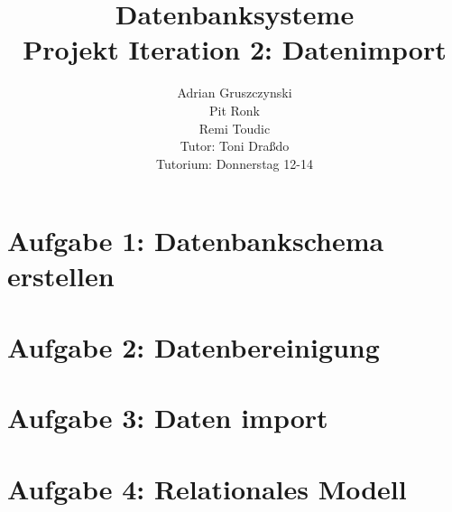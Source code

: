 \documentclass[12pt]{article}
\title{Datenbanksysteme\\
			 Projekt Iteration 2: Datenimport}
\author{Adrian Gruszczynski\\ 
			Pit Ronk\\ %
			Remi Toudic\\ %
		Tutor: Toni Draßdo\\
		Tutorium: Donnerstag 12-14}
\begin{document}
\maketitle
\section*{Aufgabe 1: Datenbankschema erstellen}

\newpage
\section*{Aufgabe 2: Datenbereinigung}

\newpage
\section*{Aufgabe 3: Daten import}


\section*{Aufgabe 4: Relationales Modell}
\end{document}

